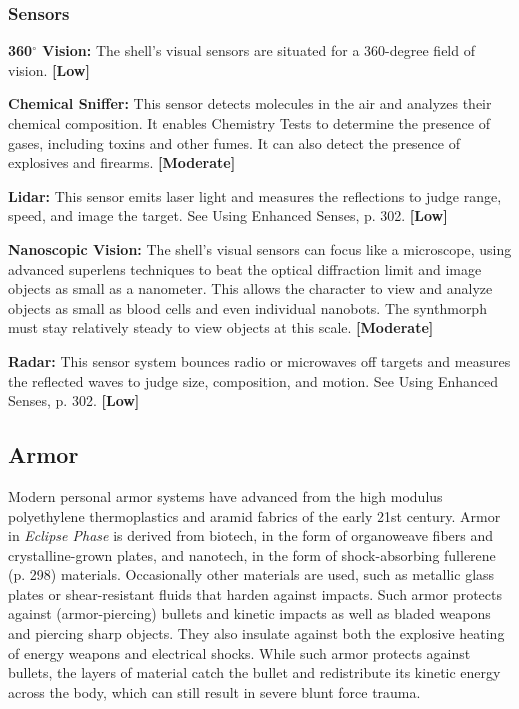 \subsubsection{Sensors} 

\textbf{360$^{\circ}$ Vision:} The shell’s visual sensors are situated for a 360-degree field of vision. \textbf{[Low]} 

\textbf{Chemical Sniffer:} This sensor detects molecules in the air and analyzes their chemical composition. It enables Chemistry Tests to determine the presence of gases, including toxins and other fumes. It can also detect the presence of explosives and firearms. \textbf{[Moderate]} 

\textbf{Lidar:} This sensor emits laser light and measures the reflections to judge range, speed, and image the target. See Using Enhanced Senses, p. 302. \textbf{[Low]} 

\textbf{Nanoscopic Vision:} The shell’s visual sensors can focus like a microscope, using advanced superlens techniques to beat the optical diffraction limit and image objects as small as a nanometer. This allows the character to view and analyze objects as small as blood cells and even individual nanobots. The synthmorph must stay relatively steady to view objects at this scale. \textbf{[Moderate]} 

\textbf{Radar:} This sensor system bounces radio or microwaves off targets and measures the reflected waves to judge size, composition, and motion. See Using Enhanced Senses, p. 302. \textbf{[Low]} 

\subsection{Armor} \label{sec:armor} 

Modern personal armor systems have advanced from the high modulus polyethylene thermoplastics and aramid fabrics of the early 21st century. Armor in \emph{Eclipse Phase} is derived from biotech, in the form of organoweave fibers and crystalline-grown plates, and nanotech, in the form of shock-absorbing fullerene (p. 298) materials. Occasionally other materials are used, such as metallic glass plates or shear-resistant fluids that harden against impacts. Such armor protects against (armor-piercing) bullets and kinetic impacts as well as bladed weapons and piercing sharp objects. They also insulate against both the explosive heating of energy weapons and electrical shocks. While such armor protects against bullets, the layers of material catch the bullet and redistribute its kinetic energy across the body, which can still result in severe blunt force trauma. 

